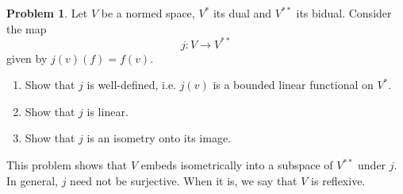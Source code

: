\documentclass[12pt]{article}
\theoremstyle{definition}
\newtheorem{ex}{Problem}
\begin{document}
\begin{ex}
	Let $V$ be a normed space, $V^*$ its dual and $V^{**}$ its bidual. Consider the map \begin{equation*}
		j : V \to V^{**}
	\end{equation*}
	given by $j(v)(f) = f(v)$.
	\begin{enumerate}[label=(\alph*)]
		\item Show that $j$ is well-defined, i.e. $j(v)$ is a bounded linear functional on $V^*$.
		\item Show that $j$ is linear.
		\item Show that $j$ is an isometry onto its image.
	\end{enumerate}
	This problem shows that $V$ embeds isometrically into a subspace of $V^{**}$ under $j$.
	In general, $j$ need not be surjective.
	When it is, we say that $V$ is reflexive.
\end{ex}
\end{document}
